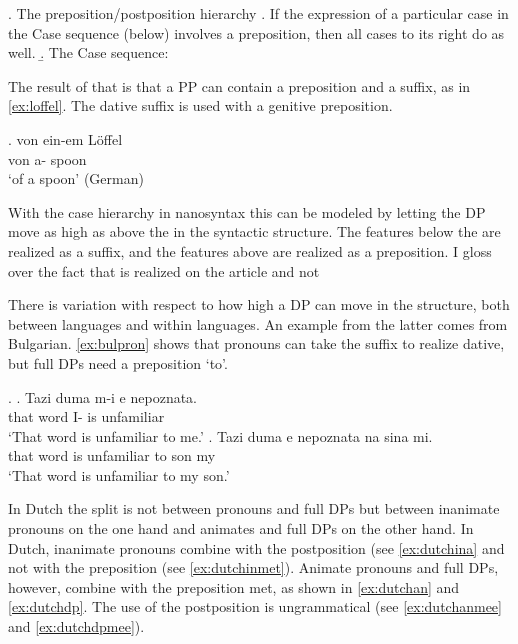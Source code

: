 \documentclass[12pt]{article}
\begin{document}
\ex. The preposition/postposition hierarchy
\a. If the expression of a particular case in the Case sequence (below) involves a preposition, then all cases to its right do as well.
\b. The Case sequence:  \hfill \citep{caha2009}

The result of that is that a PP can contain a preposition and a suffix, as in \ref{ex:loffel}. The dative suffix is used with a genitive preposition.

\exg. von ein-em Löffel\\
von a- spoon\\
`of a spoon' \hfill (German)\label{ex:loffel}

With the case hierarchy in nanosyntax this can be modeled by letting the DP move as high as above the  in the syntactic structure. The features below the  are realized as a suffix, and the features above  are realized as a preposition. I gloss over the fact that  is realized on the article and not

There is variation with respect to how high a DP can move in the structure, both between languages and within languages. An example from the latter comes from Bulgarian. \ref{ex:bulpron} shows that pronouns can take the suffix  to realize dative, but full DPs need a preposition  `to'.

\ex.\label{ex:bulgarian}
\ag. Tazi duma m-i e nepoznata.\\
that word I- is unfamiliar\\
`That word is unfamiliar to me.'\label{ex:bulpron}
\bg. Tazi duma e nepoznata na sina mi.\\
that word is unfamiliar to son my\\
`That word is unfamiliar to my son.'\label{ex:buldpto}

In Dutch the split is not between pronouns and full DPs but between inanimate pronouns on the one hand and animates and full DPs on the other hand. In Dutch, inanimate pronouns combine with the postposition  (see \ref{ex:dutchina} and not with the preposition  (see \ref{ex:dutchinmet}). Animate pronouns and full DPs, however, combine with the preposition met, as shown in \ref{ex:dutchan} and \ref{ex:dutchdp}. The use of the postposition  is ungrammatical (see \ref{ex:dutchanmee} and \ref{ex:dutchdpmee}).
\end{document}
